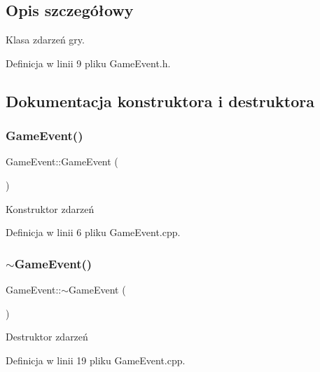\subsection{Opis szczegółowy}
Klasa zdarzeń gry. 

Definicja w linii 9 pliku Game\+Event.\+h.



\subsection{Dokumentacja konstruktora i destruktora}
\mbox{\label{class_game_event_a0a8133b65ffc98712879d18186ef3020}} 
\subsubsection{\texorpdfstring{Game\+Event()}{GameEvent()}}
{\footnotesize\ttfamily Game\+Event\+::\+Game\+Event (\begin{DoxyParamCaption}{ }\end{DoxyParamCaption})}



Konstruktor zdarzeń 



Definicja w linii 6 pliku Game\+Event.\+cpp.

\mbox{\label{class_game_event_aaf514ed35c80bbbcc54ce411d9d71eef}} 
\subsubsection{\texorpdfstring{$\sim$\+Game\+Event()}{~GameEvent()}}
{\footnotesize\ttfamily Game\+Event\+::$\sim$\+Game\+Event (\begin{DoxyParamCaption}{ }\end{DoxyParamCaption})\hspace{0.3cm}{\ttfamily [virtual]}}



Destruktor zdarzeń 



Definicja w linii 19 pliku Game\+Event.\+cpp.



